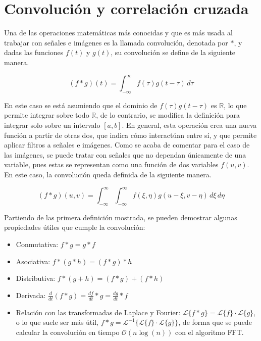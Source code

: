 	\section{Convolución y correlación cruzada}
	
		Una de las operaciones matemáticas más conocidas y que es más usada al trabajar con señales e imágenes es la llamada convolución, denotada por $\ast$, y dadas las funciones $f(t)$ y $g(t)$, su convolución se define de la siguiente manera. 
		
		$$
		(f \ast g)(t) = \int_{-\infty}^\infty f(\tau)g(t - \tau)\,d\tau
		$$
		
		En este caso se está asumiendo que el dominio de $f(\tau)g(t - \tau)$ es $\mathbb{R}$, lo que permite integrar sobre todo $\mathbb{R}$, de lo contrario, se modifica la definición para integrar solo sobre un intervalo $[a, b]$. En general, esta operación crea una nueva función a partir de otras dos, que indica cómo interactúan entre sí, y que permite aplicar filtros a señales e imágenes. Como se acaba de comentar para el caso de las imágenes, se puede tratar con señales que no dependan únicamente de una variable, pues estas se representan como una función de dos variables $f(u, v)$. En este caso, la convolución queda definida de la siguiente manera. 
		
		$$
		(f \ast g)(u, v) = \int_{-\infty}^\infty\int_{-\infty}^\infty f(\xi, \eta)g(u - \xi, v - \eta)\,d\xi\,d\eta
		$$
		
		Partiendo de las primera definición mostrada, se pueden demostrar algunas propiedades útiles que cumple la convolución\cite{lopez2009metodo}: 
		
		\begin{itemize}
			\item Conmutativa: $f \ast g = g \ast f$
			\item Asociativa: $f \ast (g \ast h) = (f \ast g) \ast h$
			\item Distributiva: $f \ast (g + h) = (f \ast g) + (f \ast h)$
			\item Derivada: $\frac{d}{dt}(f \ast g) = \frac{df}{dt}\ast g = \frac{dg}{dt}\ast f$
			\item Relación con las transformadas de Laplace y Fourier: $\mathscr{L}\{f \ast g\} = \mathscr{L}\{f\} \cdot \mathscr{L}\{g\}$, o lo que suele ser más útil, $f \ast g = \mathscr{L}^{-1}\{\mathscr{L}\{f\}\cdot\mathscr{L}\{g\}\}$, de forma que se puede calcular la convolución en tiempo $\mathcal{O}(n\log(n))$ con el algoritmo FFT\cite{fft}. 
		\end{itemize}
		

